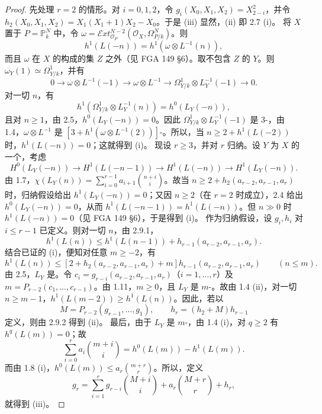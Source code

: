 \begin{proof}
先处理 $r=2$ 的情形。对 $i=0,1,2$，令 $g_i(X_0,X_1,X_2)=X_{2-i}^2$，并令 $h_2(X_0,X_1,X_2)=X_1(X_1+1)X_2-X_0$。于是 (iii) 显然，(ii) 即 2.7 (i)。
将 $X$ 置于 $P=\mathbb P_k^N$ 中，令 $\omega=\mathcal E xt_{\mathcal O_P}^{N-2}(\mathcal O_X,\Omega^N_{P/k})$。则
\[h^1(L(-n))=h^1(\omega\otimes L^{-1}(n)),\]
而且 $\omega$ 在 $X$ 的构成的集 $Z$ 之外（见 FGA 149 §6）。取不包含 $Z$ 的 $Y$。则 $\omega_Y(1)\simeq\Omega^1_{Y/k}$，并有
\[0\longrightarrow\omega\otimes L^{-1}(-1)\longrightarrow\omega\otimes L^{-1}
\longrightarrow\Omega^1_{Y/k}\otimes L_Y^{-1}(-1)\longrightarrow0.\]
对一切 $n$，有
\[h^1(\Omega^1_{Y/k}\otimes L_Y^{-1}(n))=h^0(L_Y(-n)),\]
且对 $n\geq1$，由 2.5，$h^0(L_Y(-n))=0$。因此 $\Omega^1_{Y/k}\otimes L_Y^{-1}(-1)$ 是 $3$-，由 1.4，$\omega\otimes L^{-1}$ 是 $[3+h^1(\omega\otimes L^{-1}(2))]$-。所以，当 $n\geq2+h^1(L(-2))$ 时，$h^1(L(-n))=0$；这就得到 (i)。
现设 $r\geq3$，并对 $r$ 归纳。设 $Y$ 为 $X$ 的一个，考虑
\[H^0(L_Y(-n))\longrightarrow H^1(L(-n-1))\longrightarrow H^1(L(-n))\longrightarrow H^1(L_Y(-n)).\tag{2.9.1}\]
由 1.7，$\chi(L_Y(n))=\sum_{i=0}^{r-1}a_{i+1}\binom{n+i}{i}$。故当 $n\geq2+h_2(a_{r-2},a_{r-1},a_r)$ 时，归纳假设给出 $h^1(L_Y(-n))=0$；又因 $n\geq2$（在 $r=2$ 时成立），2.4 给出 $h^0(L_Y(-n))=0$，从而 $h^1(L(-n-1))=h^1(L(-n))$。但 $n\gg0$ 时 $h^1(L(-n))=0$（见 FGA 149 §6），于是得到 (i)。
作为归纳假设，设 $g_i,h_i$ 对 $i\leq r-1$ 已定义。则对一切 $n$，由 2.9.1，
\[h^1(L(n))\leq h^1(L(n-1))+h_{r-1}(a_{r-2},a_{r-1},a_r).\]
结合已证的 (i)，便知对任意 $m\geq-2$，有
\[h^1(L(n))\leq[2+h_2(a_{r-2},a_{r-1},a_r)+m]h_{r-1}(a_{r-2},a_{r-1},a_r)\qquad(n\leq m).\tag{2.9.2}\]
由 2.5，$L_Y$ 是。令 $c_i=g_{r-i}(a_{r-2},a_{r-1},a_r)$（$i=1,\ldots,r$）及 $m=P_{r-2}(c_1,\ldots,c_{r-1})$。由 1.11，$m\geq0$，且 $L_Y$ 是 $m$-。故由 1.4 (ii)，对一切 $n\geq m-1$，$h^1(L(m-2))\geq h^1(L(n))$。因此，若以
\[M=P_{r-2}(g_{r-1},\ldots,g_1),\qquad h_r=(h_2+M)h_{r-1}\]
定义，则由 2.9.2 得到 (ii)。
最后，由于 $L_Y$ 是 $m$-，由 1.4 (i)，对 $q\geq2$ 有 $h^q(L(m))=0$；故
\[\sum_{i=0}^r a_i\binom{m+i}{i}=h^0(L(m))-h^1(L(m)).\]
而由 1.8 (i)，$h^0(L(m))\leq a_r\binom{m+r}{r}$。所以，定义
\[g_r=\sum_{i=1}^r g_{r-i}\binom{M+i}{i}+a_r\binom{M+r}{r}+h_r,\]
就得到 (iii)。
\end{proof}
